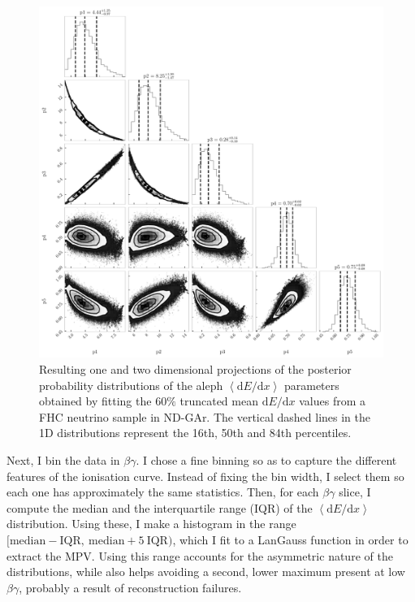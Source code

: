 \begin{figure}[t]
	\centering
	\includegraphics[width=.85\linewidth]{Images/GArSoft_PID/dEdx/mcmc_weighted_equal_frequency_bin_200.pdf}
	\caption[Resulting one and two dimensional projections of the posterior probability distributions of the \gls{aleph} $\left<\mathrm{d}E/\mathrm{d}x\right>$ parameters obtained by fitting the $60\%$ truncated mean $\mathrm{d}E/\mathrm{d}x$ values from a FHC neutrino sample.]{Resulting one and two dimensional projections of the posterior probability distributions of the \gls{aleph} $\left<\mathrm{d}E/\mathrm{d}x\right>$ parameters obtained by fitting the $60\%$ truncated mean $\mathrm{d}E/\mathrm{d}x$ values from a FHC neutrino sample in ND-GAr. The vertical dashed lines in the 1D distributions represent the 16th, 50th and 84th percentiles.}
	\label{fig:dEdx_aleph_fit}
\end{figure}

Next, I bin the data in $\beta\gamma$. I chose a fine binning so as to capture the different features of the ionisation curve. Instead of fixing the bin width, I select them so each one has approximately the same statistics. Then, for each $\beta\gamma$ slice, I compute the median and the interquartile range (IQR) of the $\left<\mathrm{d}E/\mathrm{d}x\right>$ distribution. Using these, I make a histogram in the range $[\mathrm{median}-\mathrm{IQR},~ \mathrm{median}+5~\mathrm{IQR})$, which I fit to a LanGauss function in order to extract the MPV. Using this range accounts for the asymmetric nature of the distributions, while also helps avoiding a second, lower maximum present at low $\beta\gamma$, probably a result of reconstruction failures.

